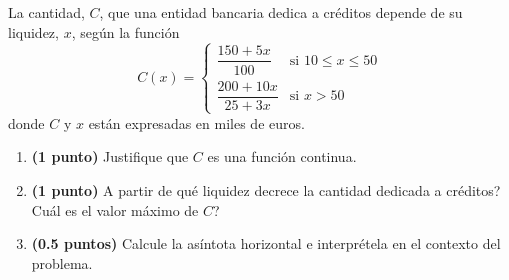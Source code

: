 
La cantidad, $C$, que una entidad bancaria dedica a créditos depende de su liquidez, $x$, según la función
\[
C(x)=\begin{cases}
\dfrac{150+5x}{100} & \text{si }10\leq x\leq50\\[4pt]
\dfrac{200+10x}{25+3x} & \text{si }x>50
\end{cases}
\]
donde $C$ y $x$ están expresadas en miles de euros.
\begin{enumerate}[label=\alph*)]
\item \textbf{(1 punto)} Justifique que $C$ es una función continua.
\item \textbf{(1 punto)} \textquestiondown{}A partir de qué liquidez decrece la cantidad dedicada a créditos? \textquestiondown{}Cuál es el valor máximo de $C$?
\item \textbf{(0.5 puntos)} Calcule la asíntota horizontal e interprétela en el contexto del problema.
\end{enumerate}
